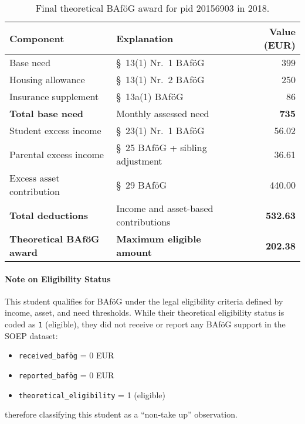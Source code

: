 \begin{table}[H]
\scriptsize
\centering
\begin{tabular}{llr}
\toprule
\textbf{Component} & \textbf{Explanation} & \textbf{Value (EUR)} \\
\midrule
Base need & §~13(1) Nr.~1 BAföG & 399 \\
Housing allowance & §~13(1) Nr.~2 BAföG & 250 \\
Insurance supplement & §~13a(1) BAföG & 86 \\
\midrule
\textbf{Total base need} & Monthly assessed need & \textbf{735} \\
\midrule
Student excess income & §~23(1) Nr.~1 BAföG & 56.02 \\
Parental excess income & §~25 BAföG + sibling adjustment & 36.61 \\
Excess asset contribution & §~29 BAföG & 440.00 \\
\midrule
\textbf{Total deductions} & Income and asset-based contributions & \textbf{532.63} \\
\midrule
\textbf{Theoretical BAföG award} & \textbf{Maximum eligible amount} & \textbf{202.38} \\
\bottomrule
\end{tabular}
\caption{Final theoretical BAföG award for pid 20156903 in 2018.}
\label{table:bafoeg_final_award}
\end{table}

\paragraph{Note on Eligibility Status}
This student qualifies for BAföG under the legal eligibility criteria defined by income, asset, and need thresholds. 
While their theoretical eligibility status is coded as \texttt{1} (eligible), they did not receive or report any BAföG support in the SOEP dataset:

\begin{itemize}
    \item \texttt{received\_bafög} = 0 EUR
    \item \texttt{reported\_bafög} = 0 EUR
    \item \texttt{theoretical\_eligibility} = 1 (eligible)
\end{itemize}
therefore classifying this student as a ``non-take up'' observation.
